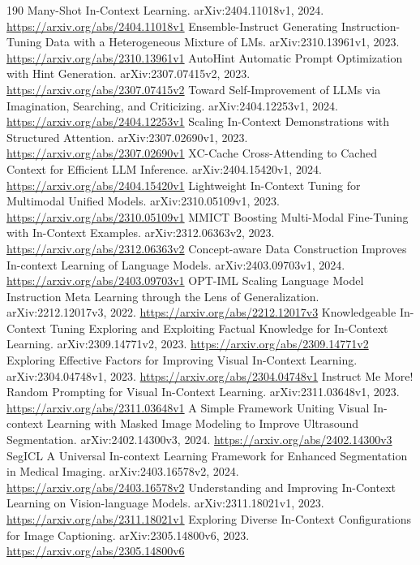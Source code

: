 \documentclass[11pt]{article}
\begin{document}
\begin{thebibliography}{190}
 Many-Shot In-Context Learning. arXiv:2404.11018v1, 2024. \url{https://arxiv.org/abs/2404.11018v1}
 Ensemble-Instruct Generating Instruction-Tuning Data with a Heterogeneous Mixture of LMs. arXiv:2310.13961v1, 2023. \url{https://arxiv.org/abs/2310.13961v1}
 AutoHint Automatic Prompt Optimization with Hint Generation. arXiv:2307.07415v2, 2023. \url{https://arxiv.org/abs/2307.07415v2}
 Toward Self-Improvement of LLMs via Imagination, Searching, and Criticizing. arXiv:2404.12253v1, 2024. \url{https://arxiv.org/abs/2404.12253v1}
 Scaling In-Context Demonstrations with Structured Attention. arXiv:2307.02690v1, 2023. \url{https://arxiv.org/abs/2307.02690v1}
 XC-Cache Cross-Attending to Cached Context for Efficient LLM Inference. arXiv:2404.15420v1, 2024. \url{https://arxiv.org/abs/2404.15420v1}
 Lightweight In-Context Tuning for Multimodal Unified Models. arXiv:2310.05109v1, 2023. \url{https://arxiv.org/abs/2310.05109v1}
 MMICT Boosting Multi-Modal Fine-Tuning with In-Context Examples. arXiv:2312.06363v2, 2023. \url{https://arxiv.org/abs/2312.06363v2}
 Concept-aware Data Construction Improves In-context Learning of Language Models. arXiv:2403.09703v1, 2024. \url{https://arxiv.org/abs/2403.09703v1}
 OPT-IML Scaling Language Model Instruction Meta Learning through the Lens of Generalization. arXiv:2212.12017v3, 2022. \url{https://arxiv.org/abs/2212.12017v3}
 Knowledgeable In-Context Tuning Exploring and Exploiting Factual Knowledge for In-Context Learning. arXiv:2309.14771v2, 2023. \url{https://arxiv.org/abs/2309.14771v2}
 Exploring Effective Factors for Improving Visual In-Context Learning. arXiv:2304.04748v1, 2023. \url{https://arxiv.org/abs/2304.04748v1}
 Instruct Me More! Random Prompting for Visual In-Context Learning. arXiv:2311.03648v1, 2023. \url{https://arxiv.org/abs/2311.03648v1}
 A Simple Framework Uniting Visual In-context Learning with Masked Image Modeling to Improve Ultrasound Segmentation. arXiv:2402.14300v3, 2024. \url{https://arxiv.org/abs/2402.14300v3}
 SegICL A Universal In-context Learning Framework for Enhanced Segmentation in Medical Imaging. arXiv:2403.16578v2, 2024. \url{https://arxiv.org/abs/2403.16578v2}
 Understanding and Improving In-Context Learning on Vision-language Models. arXiv:2311.18021v1, 2023. \url{https://arxiv.org/abs/2311.18021v1}
 Exploring Diverse In-Context Configurations for Image Captioning. arXiv:2305.14800v6, 2023. \url{https://arxiv.org/abs/2305.14800v6}

\end{thebibliography}
\end{document}
